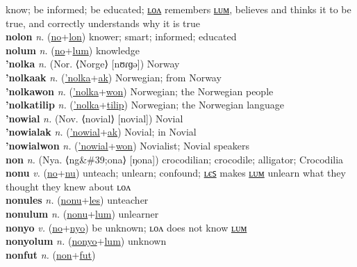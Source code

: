 know; be informed; be educated; \hyperref[nolon]{ʟᴏᴧ} remembers \hyperref[nolum]{ʟᴜᴍ}, believes and thinks it to be true, and correctly understands why it is true \label{no} \\
\textbf{nolon} \textit{n.} (\hyperref[no]{no}+\hyperref[lon]{lon})
knower; smart; informed; educated \label{nolon} \\
\textbf{nolum} \textit{n.} (\hyperref[no]{no}+\hyperref[lum]{lum})
knowledge \label{nolum} \\
\textbf{'nolka} \textit{n.} (Nor. ⟨Norge⟩ [nʊɾɡə])
Norway \label{'nolka} \\
\textbf{'nolkaak} \textit{n.} (\hyperref['nolka]{'nolka}+\hyperref[ak]{ak})
Norwegian; from Norway \label{'nolkaak} \\
\textbf{'nolkawon} \textit{n.} (\hyperref['nolka]{'nolka}+\hyperref[won]{won})
Norwegian; the Norwegian people \label{'nolkawon} \\
\textbf{'nolkatilip} \textit{n.} (\hyperref['nolka]{'nolka}+\hyperref[tilip]{tilip})
Norwegian; the Norwegian language \label{'nolkatilip} \\
\textbf{'nowial} \textit{n.} (Nov. ⟨novial⟩ [novial])
Novial \label{'nowial} \\
\textbf{'nowialak} \textit{n.} (\hyperref['nowial]{'nowial}+\hyperref[ak]{ak})
Novial; in Novial \label{'nowialak} \\
\textbf{'nowialwon} \textit{n.} (\hyperref['nowial]{'nowial}+\hyperref[won]{won})
Novialist; Novial speakers \label{'nowialwon} \\
\textbf{non} \textit{n.} (Nya. ⟨ng\&\#39;ona⟩ [ŋona])
crocodilian; crocodile; alligator; Crocodilia \label{non} \\
\textbf{nonu} \textit{v.} (\hyperref[no]{no}+\hyperref[nu]{nu})
unteach; unlearn; confound; \hyperref[nonules]{ʟєꜱ} makes \hyperref[nonulum]{ʟᴜᴍ} unlearn what they thought they knew about ʟᴏᴧ \label{nonu} \\
\textbf{nonules} \textit{n.} (\hyperref[nonu]{nonu}+\hyperref[les]{les})
unteacher \label{nonules} \\
\textbf{nonulum} \textit{n.} (\hyperref[nonu]{nonu}+\hyperref[lum]{lum})
unlearner \label{nonulum} \\
\textbf{nonyo} \textit{v.} (\hyperref[no]{no}+\hyperref[nyo]{nyo})
be unknown; ʟᴏᴧ does not know \hyperref[nonyolum]{ʟᴜᴍ} \label{nonyo} \\
\textbf{nonyolum} \textit{n.} (\hyperref[nonyo]{nonyo}+\hyperref[lum]{lum})
unknown \label{nonyolum} \\
\textbf{nonfut} \textit{n.} (\hyperref[non]{non}+\hyperref[fut]{fut})
